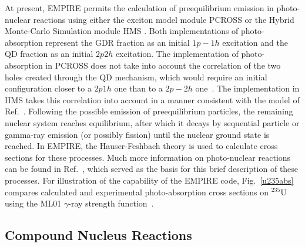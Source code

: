 At present, EMPIRE permits the calculation of preequilibrium emission in
photo-nuclear reactions using either the exciton model module PCROSS%
 or the Hybrid Monte-Carlo Simulation module HMS%
. Both implementations of photo-absorption represent the GDR
fraction as an initial $1p-1h$ excitation and the QD fraction as an initial $%
2p2h$ excitation. The implementation of photo-absorption in PCROSS does not
take into account the correlation of the two holes created through the QD
mechanism, which would require an initial configuration closer to a $2p1h$
one than to a $2p-2h$ one~\cite{PHNuc}. The implementation in HMS takes this
correlation into account in a manner consistent with the model of Ref.~\cite%
{chadQD}. Following the possible emission of preequilibrium particles, the
remaining nuclear system reaches equilibrium, after which it decays by
sequential particle or gamma-ray emission (or possibly fission) until the
nuclear ground state is reached. In EMPIRE, the Hauser-Feshbach theory is
used to calculate cross sections for these processes. Much more information
on photo-nuclear reactions can be found in Ref.~\cite{PHNuc}, which served
as the basis for this brief description of these processes. For illustration
of the capability of the EMPIRE code, Fig.~\ref{u235abs} compares
calculated and experimental photo-absorption cross sections on $^{235}$U
using the ML01 $\gamma$-ray strength function~\cite{mike2}.


\subsection{Compound Nucleus Reactions}

